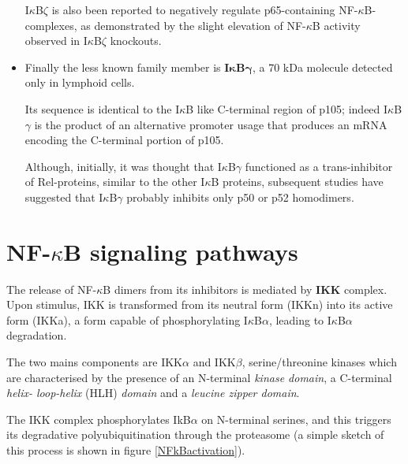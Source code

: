 \documentclass[12pt,a4paper]{report}
\begin{document}
\begin{itemize}
 I$\kappa$B$\zeta$ is also been reported to negatively regulate p65-containing NF-$\kappa$B- complexes, as demonstrated by the slight elevation of NF-$\kappa$B activity observed in I$\kappa$B$\zeta$ knockouts.
 
 
 \item Finally the less known family member is \textbf{I$\bm{\kappa}$B$\bm{\gamma}$}, a 70 kDa molecule detected only in lymphoid cells.
 
 Its sequence is identical to the I$\kappa$B like C-terminal region of p105; indeed I$\kappa$B$\gamma$ is the product of an alternative promoter usage that produces an mRNA encoding the C-terminal portion of p105.
 
 Although, initially, it was thought that I$\kappa$B$\gamma$ functioned as a trans-inhibitor of Rel-proteins, similar to the other I$\kappa$B proteins, subsequent studies have suggested that I$\kappa$B$\gamma$ probably inhibits only p50 or p52 homodimers.
\end{itemize}




\section{NF-\texorpdfstring{$\kappa$}{}B signaling pathways}\label{pathways}

The release of NF-$\kappa$B dimers from its inhibitors is mediated by \textbf{IKK} complex. Upon stimulus, IKK is transformed from its neutral form (IKKn) into its active form (IKKa), a form capable of phosphorylating I$\kappa$B$\alpha$, leading to I$\kappa$B$\alpha$ degradation. 

The two mains components are IKK$\alpha$ and IKK$\beta$, serine/threonine kinases which are characterised by the presence of an N-terminal \emph{kinase domain}, a C-terminal \emph{helix-
loop-helix} (HLH) \emph{domain} and a \emph{leucine zipper domain}.

The IKK complex phosphorylates IkB$\alpha$ on N-terminal serines, and this triggers its degradative polyubiquitination through the proteasome (a simple sketch of this process is shown in figure \ref{NFkBactivation}). 

\end{document}
